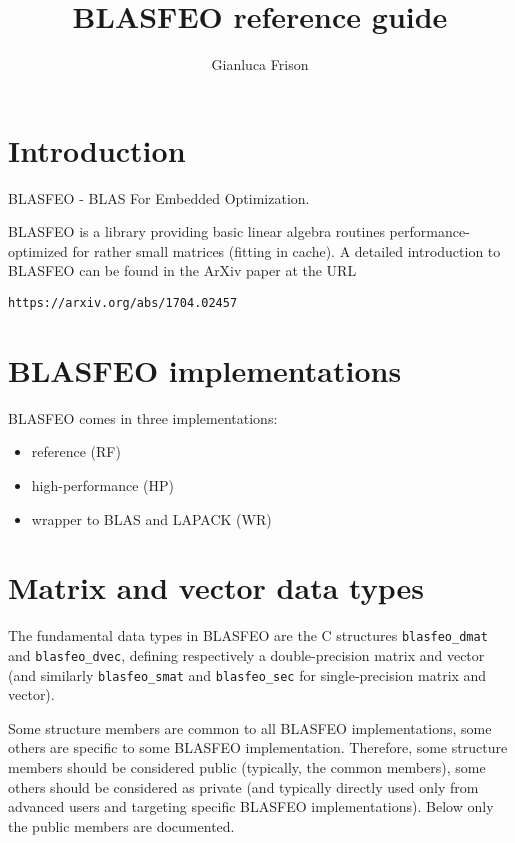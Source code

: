 \documentclass[a4paper]{report}
\title{BLASFEO reference guide}
\author{Gianluca Frison}
\begin{document}
\maketitle
\tableofcontents





\chapter{Introduction}

BLASFEO - BLAS For Embedded Optimization.

BLASFEO is a library providing basic linear algebra routines performance-optimized for rather small matrices (fitting in cache).
A detailed introduction to BLASFEO can be found in the ArXiv paper at the URL
\begin{verbatim}
https://arxiv.org/abs/1704.02457
\end{verbatim}






\chapter{BLASFEO implementations}

BLASFEO comes in three implementations:
\begin{itemize}
\item reference (RF)
\item high-performance (HP)
\item wrapper to BLAS and LAPACK (WR)
\end{itemize}


\chapter{Matrix and vector data types}

The fundamental data types in BLASFEO are the C structures {\tt blasfeo\_dmat} and {\tt blasfeo\_dvec}, defining respectively a double-precision matrix and vector (and similarly {\tt blasfeo\_smat} and {\tt blasfeo\_sec} for single-precision matrix and vector).

Some structure members are common to all BLASFEO implementations, some others are specific to some BLASFEO implementation.
Therefore, some structure members should be considered public (typically, the common members), some others should be considered as private (and typically directly used only from advanced users and targeting specific BLASFEO implementations).
Below only the public members are documented.
\end{document}
